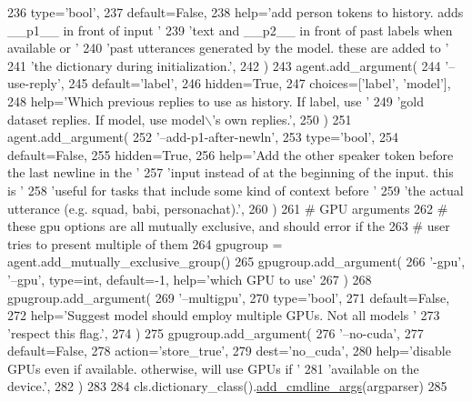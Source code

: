 \begin{DoxyCode}
236             type=\textcolor{stringliteral}{'bool'},
237             default=\textcolor{keyword}{False},
238             help=\textcolor{stringliteral}{'add person tokens to history. adds \_\_p1\_\_ in front of input '}
239             \textcolor{stringliteral}{'text and \_\_p2\_\_ in front of past labels when available or '}
240             \textcolor{stringliteral}{'past utterances generated by the model. these are added to '}
241             \textcolor{stringliteral}{'the dictionary during initialization.'},
242         )
243         agent.add\_argument(
244             \textcolor{stringliteral}{'--use-reply'},
245             default=\textcolor{stringliteral}{'label'},
246             hidden=\textcolor{keyword}{True},
247             choices=[\textcolor{stringliteral}{'label'}, \textcolor{stringliteral}{'model'}],
248             help=\textcolor{stringliteral}{'Which previous replies to use as history. If label, use '}
249             \textcolor{stringliteral}{'gold dataset replies. If model, use model\(\backslash\)'s own replies.'},
250         )
251         agent.add\_argument(
252             \textcolor{stringliteral}{'--add-p1-after-newln'},
253             type=\textcolor{stringliteral}{'bool'},
254             default=\textcolor{keyword}{False},
255             hidden=\textcolor{keyword}{True},
256             help=\textcolor{stringliteral}{'Add the other speaker token before the last newline in the '}
257             \textcolor{stringliteral}{'input instead of at the beginning of the input. this is '}
258             \textcolor{stringliteral}{'useful for tasks that include some kind of context before '}
259             \textcolor{stringliteral}{'the actual utterance (e.g. squad, babi, personachat).'},
260         )
261         \textcolor{comment}{# GPU arguments}
262         \textcolor{comment}{# these gpu options are all mutually exclusive, and should error if the}
263         \textcolor{comment}{# user tries to present multiple of them}
264         gpugroup = agent.add\_mutually\_exclusive\_group()
265         gpugroup.add\_argument(
266             \textcolor{stringliteral}{'-gpu'}, \textcolor{stringliteral}{'--gpu'}, type=int, default=-1, help=\textcolor{stringliteral}{'which GPU to use'}
267         )
268         gpugroup.add\_argument(
269             \textcolor{stringliteral}{'--multigpu'},
270             type=\textcolor{stringliteral}{'bool'},
271             default=\textcolor{keyword}{False},
272             help=\textcolor{stringliteral}{'Suggest model should employ multiple GPUs. Not all models '}
273             \textcolor{stringliteral}{'respect this flag.'},
274         )
275         gpugroup.add\_argument(
276             \textcolor{stringliteral}{'--no-cuda'},
277             default=\textcolor{keyword}{False},
278             action=\textcolor{stringliteral}{'store\_true'},
279             dest=\textcolor{stringliteral}{'no\_cuda'},
280             help=\textcolor{stringliteral}{'disable GPUs even if available. otherwise, will use GPUs if '}
281             \textcolor{stringliteral}{'available on the device.'},
282         )
283 
284         cls.dictionary\_class().\hyperlink{namespaceparlai_1_1agents_1_1drqa_1_1config_a62fdd5554f1da6be0cba185271058320}{add\_cmdline\_args}(argparser)
285 
\end{DoxyCode}
